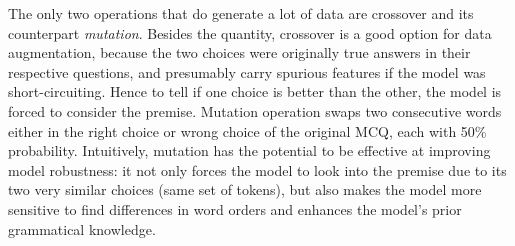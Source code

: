 The only two operations that do generate a lot of data
are crossover and its counterpart \textit{mutation}.
Besides the quantity, crossover is a good option for data augmentation,
because the two choices were originally true answers in their respective questions,
and presumably carry spurious features if the model was short-circuiting.
Hence to tell if one choice is better than the other, the model is forced to
consider the premise.
Mutation operation swaps two consecutive words either in the right choice or wrong choice of the original MCQ, each with 50\% probability.
Intuitively, mutation has the potential to be 
effective at improving model robustness:
it not only forces the model to look into the premise due to its
two very similar choices (same set of tokens), 
but also makes the model more
sensitive to find differences in word orders and 
enhances the model's prior grammatical knowledge. 

